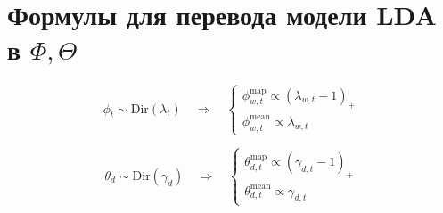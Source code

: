 \documentclass[]{article}
\begin{document}
\section{Формулы для перевода модели LDA в $\Phi, \Theta$}

$$\phi_t \sim \text{Dir}(\lambda_t) \quad \Rightarrow \quad \begin{cases}
  \phi_{w,t}^\text{map} \propto (\lambda_{w,t} - 1)_{+} \\
  \phi_{w,t}^\text{mean} \propto \lambda_{w,t}
\end{cases}$$

$$\theta_d \sim \text{Dir}(\gamma_d) \quad \Rightarrow \quad \begin{cases}
  \theta_{d,t}^\text{map} \propto (\gamma_{d,t} - 1)_{+} \\
  \theta_{d,t}^\text{mean} \propto \gamma_{d,t}
\end{cases}$$
\end{document}
